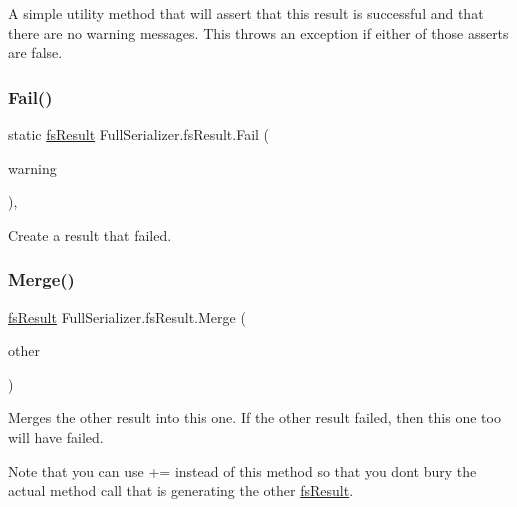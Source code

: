 A simple utility method that will assert that this result is successful and that there are no warning messages. This throws an exception if either of those asserts are false. 

\mbox{\label{struct_full_serializer_1_1fs_result_a668c1169410a20364aa7c53f98d00617}} 
\subsubsection{\texorpdfstring{Fail()}{Fail()}}
{\footnotesize\ttfamily static \hyperlink{struct_full_serializer_1_1fs_result}{fs\+Result} Full\+Serializer.\+fs\+Result.\+Fail (\begin{DoxyParamCaption}\item[{string}]{warning }\end{DoxyParamCaption})\hspace{0.3cm}{\ttfamily [inline]}, {\ttfamily [static]}}



Create a result that failed. 

\mbox{\label{struct_full_serializer_1_1fs_result_abb53580c70996e49251eb1fd4bc62f4b}} 
\subsubsection{\texorpdfstring{Merge()}{Merge()}}
{\footnotesize\ttfamily \hyperlink{struct_full_serializer_1_1fs_result}{fs\+Result} Full\+Serializer.\+fs\+Result.\+Merge (\begin{DoxyParamCaption}\item[{\hyperlink{struct_full_serializer_1_1fs_result}{fs\+Result}}]{other }\end{DoxyParamCaption})\hspace{0.3cm}{\ttfamily [inline]}}



Merges the other result into this one. If the other result failed, then this one too will have failed. 

Note that you can use += instead of this method so that you don\textquotesingle{}t bury the actual method call that is generating the other \hyperlink{struct_full_serializer_1_1fs_result}{fs\+Result}. \mbox{\label{struct_full_serializer_1_1fs_result_a6625430da8b5013745d6eb7c1512f1e6}} 
